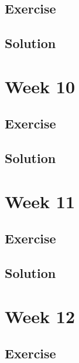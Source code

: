 \documentclass[
]{book}
\begin{document}
\hypertarget{exercise-5}{%
\section{Exercise}\label{exercise-5}}

\hypertarget{solution-6}{%
\section{Solution}\label{solution-6}}

\hypertarget{week-10}{%
\chapter{Week 10}\label{week-10}}

\hypertarget{exercise-6}{%
\section{Exercise}\label{exercise-6}}

\hypertarget{solution-7}{%
\section{Solution}\label{solution-7}}

\hypertarget{week-11}{%
\chapter{Week 11}\label{week-11}}

\hypertarget{exercise-7}{%
\section{Exercise}\label{exercise-7}}

\hypertarget{solution-8}{%
\section{Solution}\label{solution-8}}

\hypertarget{week-12}{%
\chapter{Week 12}\label{week-12}}

\hypertarget{exercise-8}{%
\section{Exercise}\label{exercise-8}}
\end{document}
